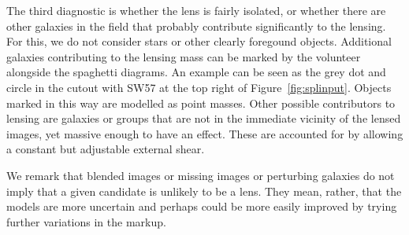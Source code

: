 The third diagnostic is whether the lens is fairly isolated, or
whether there are other galaxies in the field that probably contribute
significantly to the lensing.  For this, we do not consider stars or
other clearly foregound objects.  Additional galaxies contributing to
the lensing mass can be
marked by the volunteer alongside the spaghetti diagrams.  An example
can be seen as the grey dot and circle in the cutout with SW57 at the
top right of Figure~\ref{fig:splinput}.  Objects marked in this way
are modelled as point masses.  Other possible contributors to lensing
are galaxies or groups that are not in the immediate vicinity of
the lensed images, yet massive enough to have an effect.  These are
accounted for by allowing a constant but adjustable external shear.

We remark that blended images or missing images or perturbing galaxies
do not imply that a given candidate is unlikely to be a lens.  They
mean, rather, that the models are more uncertain and perhaps could be
more easily improved by trying further variations in the markup.

